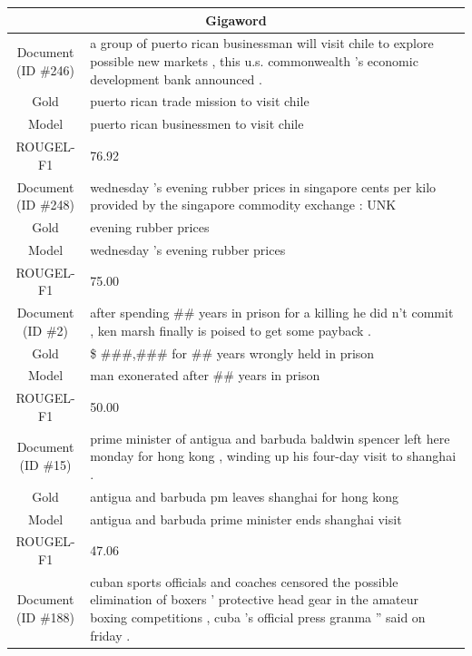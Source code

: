 \begin{table}[bth!]
\scriptsize
\centering
\renewcommand{\arraystretch}{1.3}
\begin{tabular}{c|p{}}
\hline
\multicolumn{2}{c}{Gigaword} \\ \hline
\makecell{Document\\(ID \#246)} & 
a group of puerto rican businessman will visit chile to explore possible new markets , this u.s. commonwealth 's economic development bank announced .
\\ \hline
Gold & 
puerto rican trade mission to visit chile
\\ \hline
Model & 
puerto rican businessmen to visit chile
\\ \hline
ROUGEL-F1 & 
76.92
\\ \hline
\makecell{Document\\(ID \#248)} & 
wednesday 's evening rubber prices in singapore cents per kilo provided by the singapore commodity exchange : UNK
\\ \hline
Gold & 
evening rubber prices
\\ \hline
Model & 
wednesday 's evening rubber prices
\\ \hline
ROUGEL-F1 & 
75.00
\\ \hline
\makecell{Document\\(ID \#2)} & 
after spending \#\# years in prison for a killing he did n't commit , ken marsh finally is poised to get some payback .
\\ \hline
Gold & 
\$ \#\#\#,\#\#\# for \#\# years wrongly held in prison
\\ \hline
Model & 
man exonerated after \#\# years in prison
\\ \hline
ROUGEL-F1 & 
50.00
\\ \hline
\makecell{Document\\(ID \#15)} & 
prime minister of antigua and barbuda baldwin spencer left here monday for hong kong , winding up his four-day visit to shanghai .
\\ \hline
Gold & 
antigua and barbuda pm leaves shanghai for hong kong
\\ \hline
Model & 
antigua and barbuda prime minister ends shanghai visit
\\ \hline
ROUGEL-F1 & 
47.06
\\ \hline
\makecell{Document\\(ID \#188)} & 
cuban sports officials and coaches censored the possible elimination of boxers ' protective head gear in the amateur boxing competitions , cuba 's official press    granma '' said on friday .

\end{tabular}
\end{table}
